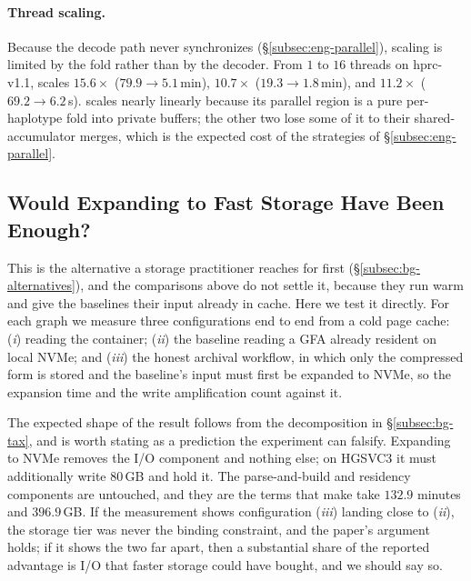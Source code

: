 \paragraph{Thread scaling.}
Because the decode path never synchronizes (\S\ref{subsec:eng-parallel}), scaling
is limited by the fold rather than by the decoder. From $1$ to $16$ threads on
hprc-v1.1,  scales $15.6\times$ ($79.9 \to 5.1$\,min),
 $10.7\times$ ($19.3 \to 1.8$\,min), and  $11.2\times$
($69.2 \to 6.2$\,s).  scales nearly linearly because its parallel
region is a pure per-haplotype fold into private buffers; the other two lose some
of it to their shared-accumulator merges, which is the expected cost of the
strategies of \S\ref{subsec:eng-parallel}.

\subsection{Would Expanding to Fast Storage Have Been Enough?}
\label{subsec:eval-expand}

This is the alternative a storage practitioner reaches for first
(\S\ref{subsec:bg-alternatives}), and the comparisons above do not settle it,
because they run warm and give the baselines their input already in cache. Here we
test it directly. For each graph we measure three configurations end to end from a
cold page cache: (\emph{i}) \sys reading the container; (\emph{ii}) the baseline
reading a GFA already resident on local NVMe; and (\emph{iii}) the honest
archival workflow, in which only the compressed form is stored and the baseline's
input must first be expanded to NVMe, so the expansion time and the write
amplification count against it.


The expected shape of the result follows from the decomposition in
\S\ref{subsec:bg-tax}, and is worth stating as a prediction the experiment can
falsify. Expanding to NVMe removes the I/O component and nothing else; on HGSVC3
it must additionally write $80$\,GB and hold it. The parse-and-build and residency
components are untouched, and they are the terms that make  take
$132.9$ minutes and $396.9$\,GB. If the measurement shows configuration
(\emph{iii}) landing close to (\emph{ii}), the storage tier was never the binding
constraint, and the paper's argument holds; if it shows the two far apart, then a
substantial share of the reported advantage is I/O that faster storage could have
bought, and we should say so.

